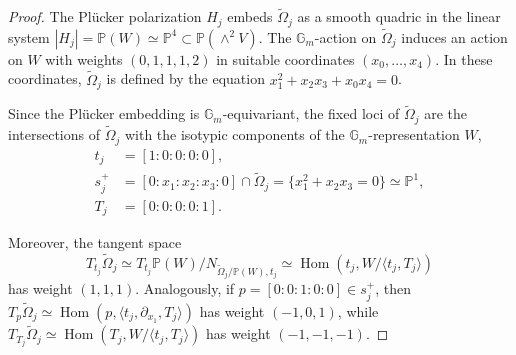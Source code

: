 \documentclass[JEP,XML,SOM,Unicode, NoEqCountersInSection,NoFloatCountersInSection,published]{cedram}
\theoremstyle{definition}
\newcommand{\Gm}{\mathbb{G}_m}
\newcommand{\PP}{\mathbb{P}}
\newcommand{\Hom}{\operatorname{Hom}}
\newcommand{\tomega}{\widetilde{\Omega}}
\begin{document}
\begin{proof}
The Plücker polarization $H_j$ embeds $\tomega_j$ as a smooth quadric in the linear system $|H_j| = \PP(W) \simeq \mathbb{P}^4 \subset \mathbb{P}(\wedge^2 V)$. The $\Gm$\nobreakdash-action on $\tomega_j$ induces an action on $W$ with weights $(0,1,1,1,2)$ in suitable coordinates $(x_0,\ldots,x_4)$. In these coordinates, $\tomega_j$ is defined by the equation $x_1^2+x_2x_3+x_0x_4=0$.

Since the Plücker embedding is $\Gm$\nobreakdash-equivariant, the fixed loci of $\tomega_j$ are the intersections of $\tomega_j$ with the isotypic components of the $\Gm$\nobreakdash-representation $W$, \ie
\begin{align*}
t_j & =[1:0:0:0:0],\\
s_j^+& = [0:x_1:x_2:x_3:0] \cap \tomega_j = \{x_1^2+x_2x_3 =0\}\simeq \PP^1,\\
T_j & = [0:0:0:0:1].
\end{align*}

Moreover, the tangent space
\[
T_{t_j}\tomega_j \simeq T_{t_j}\PP(W)/N_{\tomega_j/\PP(W), t_j} \simeq \Hom(t_j, W/\langle t_j, T_j\rangle)
\]
has weight $(1,1,1)$. Analogously, if $p = [0:0:1:0:0] \in s^{+}_j$, then
$
T_{p}\tomega_j \simeq \Hom(p, \langle t_j, \partial_{x_1}, T_j\rangle)
$
has weight $(-1,0,1)$, while $T_{T_j}\tomega_j \simeq \Hom(T_j, W/\langle t_j, T_j\rangle)$ has weight $(-1,-1,-1)$.
\end{proof}
\end{document}
